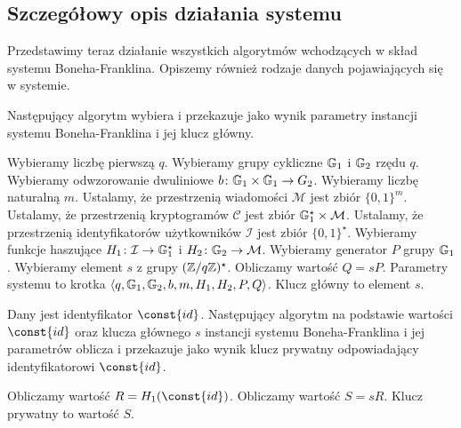 \subsection*{Szczegółowy opis działania systemu}

\noindent
Przedstawimy teraz działanie wszystkich algorytmów
wchodzących w skład systemu Boneha-Franklina.
Opiszemy również rodzaje danych pojawiających się w systemie.

\begin{algorithm}
Następujący algorytm wybiera i przekazuje jako wynik
parametry instancji systemu Boneha-Franklina
i jej klucz główny.

\begin{codebox}
\li
Wybieramy liczbę pierwszą $q$.
\li
Wybieramy grupy cykliczne $\mathbb{G}_1$ i $\mathbb{G}_2$ rzędu $q$.
\li
Wybieramy odwzorowanie dwuliniowe $b\colon \mathbb{G}_1 \times \mathbb{G}_1 \to G_2$.
\li
Wybieramy liczbę naturalną $m$.
\li
Ustalamy, że przestrzenią wiadomości $\mathcal{M}$
jest zbiór $\{0, 1\}^m$.
\li
Ustalamy, że przestrzenią kryptogramów $\mathcal{C}$
jest zbiór $\mathbb{G}_1^\star \times \mathcal{M}$.
\li
Ustalamy, że przestrzenią identyfikatorów użytkowników $\mathcal{I}$
jest zbiór $\{0, 1\}^\star$.
\li
Wybieramy funkcje haszujące
$H_1\colon \mathcal{I} \to \mathbb{G}_1^\star$
i $H_2\colon \mathbb{G}_2 \to \mathcal{M}$.
\li
Wybieramy generator $P$ grupy $\mathbb{G}_1$.
\li
Wybieramy element $s$ z grupy $(\mathbb{Z} / q\mathbb{Z})^\star$.
\li
Obliczamy wartość $Q = sP$.
\li
Parametry systemu to krotka
$\left\langle q, \mathbb{G}_1, \mathbb{G}_2, b, m, H_1, H_2, P, Q \right\rangle$.
\li
Klucz główny to element $s$.
\end{codebox}
\end{algorithm}

\begin{algorithm}
Dany jest identyfikator $\const{id}$.
Następujący algorytm na podstawie wartości $\const{id}$
oraz klucza głównego $s$ instancji systemu Boneha-Franklina i jej parametrów
oblicza i przekazuje jako wynik
klucz prywatny odpowiadający identyfikatorowi $\const{id}$.

\begin{codebox}
\li
Obliczamy wartość $R = H_1(\const{id})$.
\li
Obliczamy wartość $S = sR$.
\li
Klucz prywatny to wartość $S$.
\end{codebox}
\end{algorithm}


